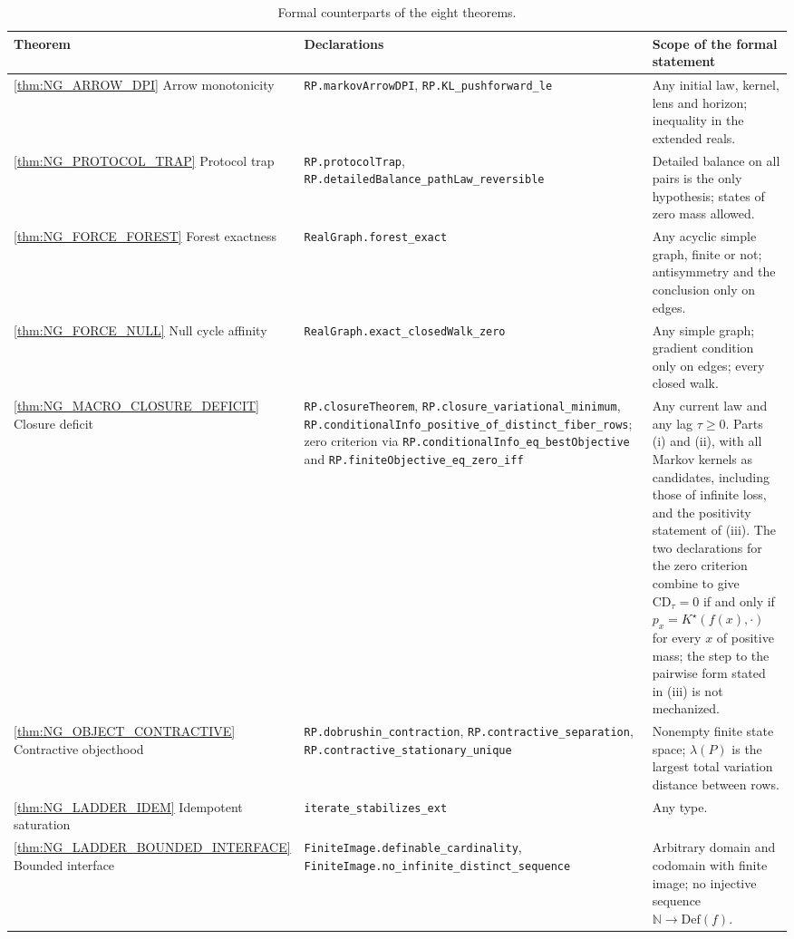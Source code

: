 \documentclass[11pt]{article}
\theoremstyle{definition}
\newcommand{\Def}{\mathrm{Def}}
\newcommand{\1}{\mathbf{1}}
\newcommand{\leanname}[1]{{\urlstyle{tt}\nolinkurl{#1}}}
\begin{document}
\begin{table}[ht]
\centering
\footnotesize
\caption{Formal counterparts of the eight theorems.}\label{tab:lean}
\renewcommand{\arraystretch}{1.2}
\begin{tabularx}{\textwidth}{@{}>{\raggedright\arraybackslash}p{}>{\raggedright\arraybackslash}p{}>{\raggedright\arraybackslash}X@{}}
\toprule
Theorem & Declarations & Scope of the formal statement \\
\midrule
\ref{thm:NG_ARROW_DPI} Arrow monotonicity & \leanname{RP.markovArrowDPI}, \leanname{RP.KL_pushforward_le} & Any initial law, kernel, lens and horizon; inequality in the extended reals. \\
\ref{thm:NG_PROTOCOL_TRAP} Protocol trap & \leanname{RP.protocolTrap}, \leanname{RP.detailedBalance_pathLaw_reversible} & Detailed balance on all pairs is the only hypothesis; states of zero mass allowed. \\
\ref{thm:NG_FORCE_FOREST} Forest exactness & \leanname{RealGraph.forest_exact} & Any acyclic simple graph, finite or not; antisymmetry and the conclusion only on edges. \\
\ref{thm:NG_FORCE_NULL} Null cycle affinity & \leanname{RealGraph.exact_closedWalk_zero} & Any simple graph; gradient condition only on edges; every closed walk. \\
\ref{thm:NG_MACRO_CLOSURE_DEFICIT} Closure deficit & \leanname{RP.closureTheorem}, \leanname{RP.closure_variational_minimum}, \leanname{RP.conditionalInfo_positive_of_distinct_fiber_rows}; zero criterion via \leanname{RP.conditionalInfo_eq_bestObjective} and \leanname{RP.finiteObjective_eq_zero_iff} & Any current law and any lag $\tau\ge 0$. Parts (i) and (ii), with all Markov kernels as candidates, including those of infinite loss, and the positivity statement of (iii). The two declarations for the zero criterion combine to give $\mathrm{CD}_\tau=0$ if and only if $p_x=K^\star(f(x),\cdot)$ for every $x$ of positive mass; the step to the pairwise form stated in (iii) is not mechanized. \\
\ref{thm:NG_OBJECT_CONTRACTIVE} Contractive objecthood & \leanname{RP.dobrushin_contraction}, \leanname{RP.contractive_separation}, \leanname{RP.contractive_stationary_unique} & Nonempty finite state space; $\lambda(P)$ is the largest total variation distance between rows. \\
\ref{thm:NG_LADDER_IDEM} Idempotent saturation & \leanname{iterate_stabilizes_ext} & Any type. \\
\ref{thm:NG_LADDER_BOUNDED_INTERFACE} Bounded interface & \leanname{FiniteImage.definable_cardinality}, \leanname{FiniteImage.no_infinite_distinct_sequence} & Arbitrary domain and codomain with finite image; no injective sequence $\mathbb{N}\to\Def(f)$. \\
\bottomrule
\end{tabularx}
\end{table}
\end{document}
